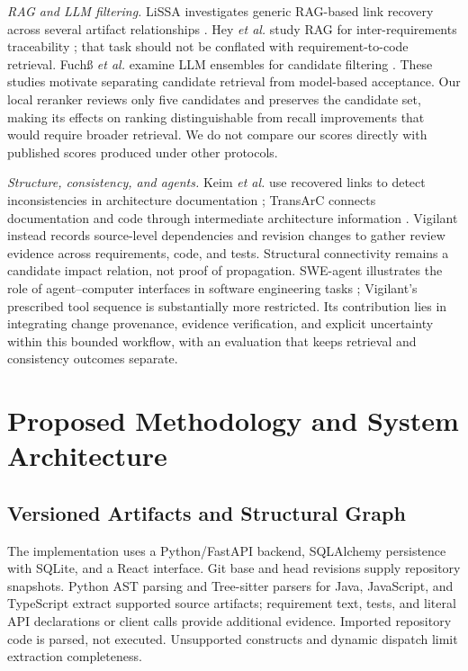 \documentclass[conference,letterpaper,10pt]{IEEEtran}
\begin{document}
\textit{RAG and LLM filtering.} LiSSA investigates generic RAG-based link recovery across several artifact relationships \cite{lissa}. Hey \emph{et al.} study RAG for inter-requirements traceability \cite{reqrag}; that task should not be conflated with requirement-to-code retrieval. Fuch\ss{} \emph{et al.} examine LLM ensembles for candidate filtering \cite{ensemble}. These studies motivate separating candidate retrieval from model-based acceptance. Our local reranker reviews only five candidates and preserves the candidate set, making its effects on ranking distinguishable from recall improvements that would require broader retrieval. We do not compare our scores directly with published scores produced under other protocols.

\textit{Structure, consistency, and agents.} Keim \emph{et al.} use recovered links to detect inconsistencies in architecture documentation \cite{archcons}; TransArC connects documentation and code through intermediate architecture information \cite{transarc}. Vigilant instead records source-level dependencies and revision changes to gather review evidence across requirements, code, and tests. Structural connectivity remains a candidate impact relation, not proof of propagation. SWE-agent illustrates the role of agent--computer interfaces in software engineering tasks \cite{sweagent}; Vigilant's prescribed tool sequence is substantially more restricted. Its contribution lies in integrating change provenance, evidence verification, and explicit uncertainty within this bounded workflow, with an evaluation that keeps retrieval and consistency outcomes separate.

\section{Proposed Methodology and System Architecture}
\subsection{Versioned Artifacts and Structural Graph}
The implementation uses a Python/FastAPI backend, SQLAlchemy persistence with SQLite, and a React interface. Git base and head revisions supply repository snapshots. Python AST parsing and Tree-sitter parsers for Java, JavaScript, and TypeScript extract supported source artifacts; requirement text, tests, and literal API declarations or client calls provide additional evidence. Imported repository code is parsed, not executed. Unsupported constructs and dynamic dispatch limit extraction completeness.
\end{document}

